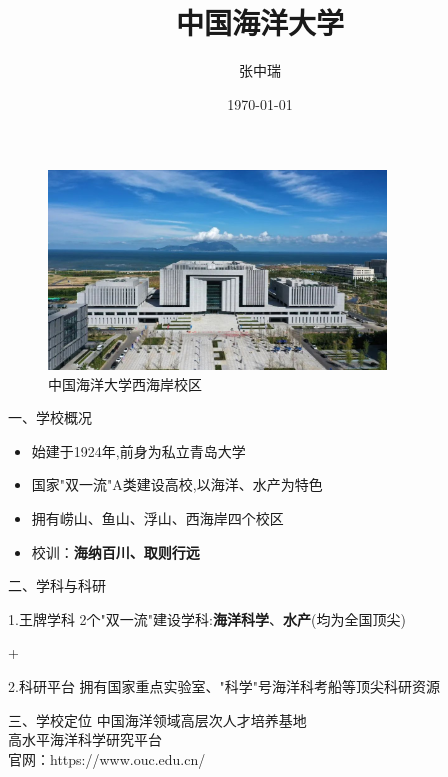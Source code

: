 \documentclass{beamer}
\begin{document}
\title{中国海洋大学}
\author{张中瑞}
\date{\today}

\begin{frame}
     \begin{figure}
     \centering 
     \includegraphics[width=0.8\textwidth]{R-c.jpg}
     \caption{中国海洋大学西海岸校区}
     \end{figure}
\end{frame}

\begin{frame}{一、学校概况}
  \begin{itemize}
   \item 始建于1924年,前身为私立青岛大学
   \item 国家"双一流"A类建设高校,以海洋、水产为特色
   \item 拥有崂山、鱼山、浮山、西海岸四个校区
   \item 校训：\textbf{海纳百川、取则行远}%
  \end{itemize}
\end{frame}

\begin{frame}{二、学科与科研}
   \begin{block}{1.王牌学科}
   2个"双一流"建设学科:\textbf{海洋科学}、\textbf{水产}(均为全国顶尖)
   \end{block}+
   \begin{block}{2.科研平台}
   拥有国家重点实验室、"科学"号海洋科考船等顶尖科研资源
   \end{block}
\end{frame}

\begin{frame}{三、学校定位}
   \centering
   \Large 中国海洋领域高层次人才培养基地 \\
   \Large 高水平海洋科学研究平台 \\
   \vspace{1cm}
   \small 官网：{https://www.ouc.edu.cn/}
\end{frame}
\end{document}
